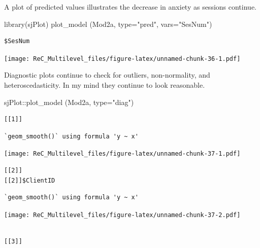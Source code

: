 \documentclass[
  11pt,
]{book}
\newenvironment{Shaded}{\begin{snugshade}}{\end{snugshade}}
\newcommand{\AttributeTok}[1]{\textcolor[rgb]{0.77,0.63,0.00}{#1}}
\newcommand{\FunctionTok}[1]{\textcolor[rgb]{0.00,0.00,0.00}{#1}}
\newcommand{\NormalTok}[1]{#1}
\newcommand{\SpecialCharTok}[1]{\textcolor[rgb]{0.00,0.00,0.00}{#1}}
\newcommand{\StringTok}[1]{\textcolor[rgb]{0.31,0.60,0.02}{#1}}
\begin{document}
A plot of predicted values illustrates the decrease in anxiety as sessions continue.

\begin{Shaded}
\begin{Highlighting}[]
\FunctionTok{library}\NormalTok{(sjPlot)}
\FunctionTok{plot\_model}\NormalTok{ (Mod2a, }\AttributeTok{type=}\StringTok{"pred"}\NormalTok{, }\AttributeTok{vars=}\StringTok{"SesNum"}\NormalTok{)}
\end{Highlighting}
\end{Shaded}

\begin{verbatim}
$SesNum
\end{verbatim}

\texttt{[image: ReC\_Multilevel\_files/figure-latex/unnamed-chunk-36-1.pdf]}

Diagnostic plots continue to check for outliers, non-normality, and heteroscedasticity. In my mind they continue to look reasonable.

\begin{Shaded}
\begin{Highlighting}[]
\NormalTok{sjPlot}\SpecialCharTok{::}\FunctionTok{plot\_model}\NormalTok{ (Mod2a, }\AttributeTok{type=}\StringTok{"diag"}\NormalTok{)}
\end{Highlighting}
\end{Shaded}

\begin{verbatim}
[[1]]
\end{verbatim}

\begin{verbatim}
`geom_smooth()` using formula 'y ~ x'
\end{verbatim}

\texttt{[image: ReC\_Multilevel\_files/figure-latex/unnamed-chunk-37-1.pdf]}

\begin{verbatim}
[[2]]
[[2]]$ClientID
\end{verbatim}

\begin{verbatim}
`geom_smooth()` using formula 'y ~ x'
\end{verbatim}

\texttt{[image: ReC\_Multilevel\_files/figure-latex/unnamed-chunk-37-2.pdf]}

\begin{verbatim}

[[3]]
\end{verbatim}
\end{document}
